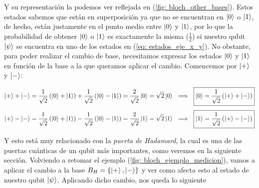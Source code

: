 \documentclass[12pt]{article}
\numberwithin{equation}{section} %
\begin{document}
    \vspace{2.5mm}

    Y su representación la podemos ver reflejada en (\ref{fig: bloch_other_bases}). Estos estados sabemos que están en superposición ya que no se encuentran en \( \ket{0} \) o \( \ket{1} \), de hecho, están justamente en el punto medio entre \( \ket{0} \) y \( \ket{1} \), por lo que la probabilidad de obtener \( \ket{0} \) o \( \ket{1} \) es exactamente la misma (\( \frac{1}{2} \)) si nuestro qubit \( \ket{\psi} \) se encuentra en uno de los estados en (\ref{eq: estados_eje_x_y}). No obstante, para poder realizar el cambio de base, necesitamos expresar los estados \( \ket{0} \) y \( \ket{1} \) en función de la base a la que queramos aplicar el cambio. Comencemos por \( \ket{+} \) y \( \ket{-} \):

    \begin{equation}
        \ket{+} + \ket{-} = \frac{1}{\sqrt{2}} \left( \ket{0} + \ket{1} \right) + \frac{1}{\sqrt{2}} \left( \ket{0} - \ket{1} \right) = \frac{2}{\sqrt{2}} \ket{0} = \sqrt{2} \ket{0} \ \implies \ \boxed{\ket{0} = \frac{1}{\sqrt{2}} \left( \ket{+} + \ket{-} \right)} 
        \label{eq: estado_0_en_funcion_mas_menos}
    \end{equation}
    \begin{equation}
        \ket{+} - \ket{-} = \frac{1}{\sqrt{2}} \left( \ket{0} + \ket{1} \right) - \frac{1}{\sqrt{2}} \left( \ket{0} - \ket{1} \right) = \frac{2}{\sqrt{2}} \ket{1} = \sqrt{2} \ket{1} \ \implies \ \boxed{\ket{1} = \frac{1}{\sqrt{2}} \left( \ket{+} - \ket{-} \right)}
        \label{eq: estado_1_en_funcion_mas_menos}
    \end{equation}

    \vspace{5mm}

    Y esto está muy relacionado con la \textit{puerta de Hadamard}, la cual es una de las puertas cuánticas de un qubit más importantes, como veremos en la siguiente sección. Volviendo a retomar el ejemplo (\ref{fig: bloch_ejemplo_medicion}), vamos a aplicar el cambio a la base \( B_{H} = \left\{ \ket{+}, \ket{-} \right\}\) y ver como afecta esto al estado de nuestro qubit \( \ket{\psi} \). Aplicando dicho cambio, nos queda lo siguiente
\end{document}

